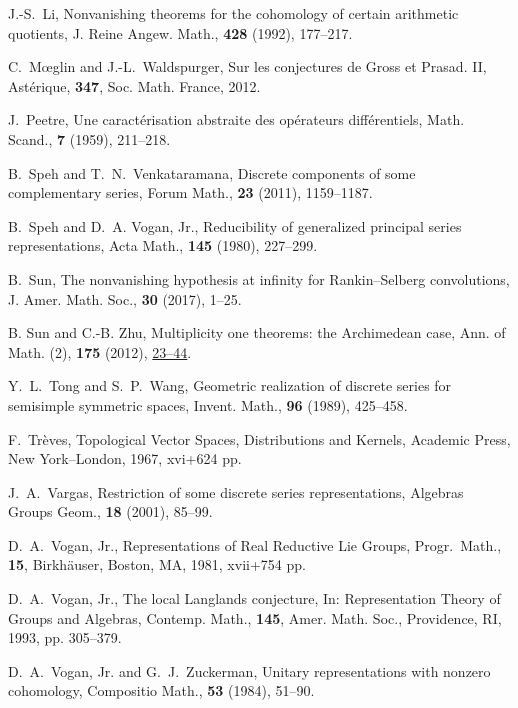 \begin{thebibliography}{M}
J.-S.~Li,
Nonvanishing theorems for the cohomology of certain arithmetic quotients,
J. Reine Angew. Math., {\bf{428}} (1992), 177--217.

C.~M{\oe}glin and J.-L.~Waldspurger,
Sur les conjectures de Gross et Prasad. II,
Ast\'{e}rique, {\bf{347}},
Soc. Math. France, 2012.

J.~Peetre,
Une caract{\'e}risation abstraite des op{\'e}rateurs diff{\'e}rentiels,
Math. Scand., {\bf{7}} (1959), 211--218.

B.~Speh and T.~N.~Venkataramana,
Discrete components of some complementary series,
Forum Math., {\bf{23}} (2011), 1159--1187.

B.~Speh and D.~A. Vogan, Jr.,
 Reducibility of generalized principal series 
representations,
Acta Math., {\bf{145}}
(1980), 227--299.  

B.~Sun,
The nonvanishing hypothesis at infinity for Rankin--Selberg convolutions,
J. Amer. Math. Soc., {\bf{30}} (2017), 1--25.

B. Sun and C.-B. Zhu,
Multiplicity one theorems: the Archimedean case,
Ann. of Math. (2), {\bf{175}} (2012),
\href{http://dx.doi.org/10.4007/annals.2012.175.1.2}
{23--44}.

Y.~L.~Tong and S.~P.~Wang,
Geometric realization of discrete series for semisimple symmetric spaces,
Invent. Math., {\bf{96}} (1989), 425--458.

F.~Tr{\`e}ves,
Topological Vector Spaces, Distributions and Kernels,
Academic Press, New York--London, 1967, xvi+624 pp.

J.~A.~Vargas,
Restriction of some discrete series representations,
Algebras Groups Geom., {\bf{18}} (2001), 85--99.

D.~A.~Vogan, Jr., 
Representations of Real Reductive Lie Groups, 
Progr.~Math., {\bf{15}}, 
Birkh{\"a}user, Boston, MA, 1981,
xvii+754 pp.

D.~A.~Vogan, Jr.,
The local Langlands conjecture,
In: Representation Theory of Groups and Algebras,
Contemp. Math., {\bf{145}}, Amer. Math. Soc., Providence, RI,
1993, pp. 305--379.

D.~A.~Vogan, Jr. and G.~J.~Zuckerman,
Unitary representations with nonzero cohomology,
Compositio Math., {\bf{53}} (1984), 51--90.


\end{thebibliography}
